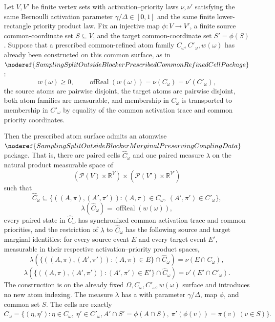 \begin{helper}
Let \(V,V'\) be finite vertex sets with activation--priority laws
\(\nu,\nu'\) satisfying the same Bernoulli activation parameter
\(\gamma/\Delta\in[0,1]\) and the same finite lower-rectangle priority product
law.  Fix an injective map \(\phi:V\to V'\), a finite source common-coordinate
set \(S\subseteq V\), and the target common-coordinate set
\(S'=\phi(S)\).  Suppose that a prescribed common-refined atom family
\(C_\omega,C'_\omega,w(\omega)\) has already been constructed on this common
surface, as in
\(\noderef{SamplingSplitOutsideBlockerPrescribedCommonRefinedCellPackage}\):
\[
  w(\omega)\ge0,\qquad
  \operatorname{ofReal}(w(\omega))=\nu(C_\omega)
  =\nu'(C'_\omega),
\]
the source atoms are pairwise disjoint, the target atoms are pairwise
disjoint, both atom families are measurable, and membership in
\(C_\omega\) is transported to membership in \(C'_\omega\) by equality of the
common activation trace and common priority coordinates.

Then the prescribed atom surface admits an atomwise
\(\noderef{SamplingSplitOutsideBlockerMarginalPreservingCouplingData}\)
package.  That is, there are paired cells
\(\widehat C_\omega\) and one paired measure \(\lambda\) on the natural
product measurable space of
\[
  (\mathcal P(V)\times\mathbb R^V)\times
  (\mathcal P(V')\times\mathbb R^{V'})
\]
such that
\[
  \widehat C_\omega\subseteq
  \{((A,\pi),(A',\pi')):(A,\pi)\in C_\omega,\ (A',\pi')\in C'_\omega\},
\]
\[
  \lambda(\widehat C_\omega)=\operatorname{ofReal}(w(\omega)),
\]
every paired state in \(\widehat C_\omega\) has synchronized common
activation trace and common priorities, and the restriction of \(\lambda\) to
\(\widehat C_\omega\) has the following source and target marginal
identities: for every source event \(E\) and every target event \(E'\),
measurable in their respective activation--priority product spaces,
\[
  \lambda(\{((A,\pi),(A',\pi')):(A,\pi)\in E\}\cap\widehat C_\omega)
    =\nu(E\cap C_\omega),
\]
\[
  \lambda(\{((A,\pi),(A',\pi')):(A',\pi')\in E'\}\cap\widehat C_\omega)
    =\nu'(E'\cap C'_\omega).
\]
The construction is on the already fixed
\(\Omega,C_\omega,C'_\omega,w(\omega)\) surface and introduces no new atom
indexing.
The measure $\lambda$ has a
 with parameter
$\gamma/\Delta$, map $\phi$, and common set $S$. The cells are exactly
\[
\widehat C_\omega=\{(\eta,\eta'): \eta\in C_\omega,\ \eta'\in C'_\omega,
 A'\cap S'=\phi(A\cap S),\ \pi'(\phi(v))=\pi(v)\ (v\in S)\}.
\]
\end{helper}
